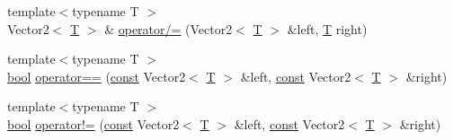 \begin{DoxyCompactItemize}
\item 
{\footnotesize template$<$typename T $>$ }\\Vector2$<$ \hyperlink{curses_8priv_8h_a5ef253115820acf7d27f3c5c3b02a0f0}{T} $>$ \& \hyperlink{sfml_2dep_2_s_f_m_l-2_84_82_2include_2_s_f_m_l_2_system_2_vector2_8inl_ad2184b7a2f3e06a149072232f916cd16}{operator/=} (Vector2$<$ \hyperlink{curses_8priv_8h_a5ef253115820acf7d27f3c5c3b02a0f0}{T} $>$ \&left, \hyperlink{curses_8priv_8h_a5ef253115820acf7d27f3c5c3b02a0f0}{T} right)
\item 
{\footnotesize template$<$typename T $>$ }\\\hyperlink{term__entry_8h_a002004ba5d663f149f6c38064926abac}{bool} \hyperlink{sfml_2dep_2_s_f_m_l-2_84_82_2include_2_s_f_m_l_2_system_2_vector2_8inl_a9a7b2d36c3850828fdb651facfd25136}{operator==} (\hyperlink{term__entry_8h_a57bd63ce7f9a353488880e3de6692d5a}{const} Vector2$<$ \hyperlink{curses_8priv_8h_a5ef253115820acf7d27f3c5c3b02a0f0}{T} $>$ \&left, \hyperlink{term__entry_8h_a57bd63ce7f9a353488880e3de6692d5a}{const} Vector2$<$ \hyperlink{curses_8priv_8h_a5ef253115820acf7d27f3c5c3b02a0f0}{T} $>$ \&right)
\item 
{\footnotesize template$<$typename T $>$ }\\\hyperlink{term__entry_8h_a002004ba5d663f149f6c38064926abac}{bool} \hyperlink{sfml_2dep_2_s_f_m_l-2_84_82_2include_2_s_f_m_l_2_system_2_vector2_8inl_a01673da35ef9c52d0e54b8263549a956}{operator!=} (\hyperlink{term__entry_8h_a57bd63ce7f9a353488880e3de6692d5a}{const} Vector2$<$ \hyperlink{curses_8priv_8h_a5ef253115820acf7d27f3c5c3b02a0f0}{T} $>$ \&left, \hyperlink{term__entry_8h_a57bd63ce7f9a353488880e3de6692d5a}{const} Vector2$<$ \hyperlink{curses_8priv_8h_a5ef253115820acf7d27f3c5c3b02a0f0}{T} $>$ \&right)
\end{DoxyCompactItemize}


